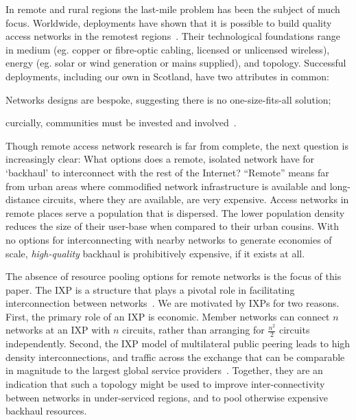 In remote and rural regions the last-mile problem has been the subject of much
focus. Worldwide, deployments have shown that it is possible to build quality
access networks in the remotest regions~\cite{xxx}. Their technological
foundations range in medium (eg. copper or fibre-optic cabling, licensed
or unlicensed wireless), energy (eg. solar or wind generation or
mains supplied), and topology.
Successful deployments, including our own in Scotland,
have two attributes in common:
\begin{inparaenum}[(i)]
  \item Networks designs are bespoke, suggesting
    there is no one-size-fits-all solution;
  \item curcially, communities must be invested and
    involved~\cite{Wallace:2015a,Wallace:2015b}.
\end{inparaenum}

Though remote access network research is far from complete, the next question
is increasingly clear: What options does a remote, isolated network have for
`backhaul' to interconnect with the rest of the Internet? ``Remote'' means far
from urban areas where commodified network infrastructure is available and
long-distance circuits, where they are available, are very expensive. Access
networks in remote places serve a population that is dispersed. The lower
population density reduces the size of their user-base when compared to their
urban cousins. With no options for interconnecting with nearby
networks to generate economies of scale, \emph{high-quality} backhaul
is prohibitively expensive, if it exists at all.


The absence of resource pooling options for remote networks is the focus of this
paper. The \acf{IXP} is a structure that plays a pivotal role in facilitating
interconnection between networks~\cite{Ager:2012}. We are motivated by
\acp{IXP} for two reasons. First, the primary role of an \ac{IXP} is economic.
Member networks can connect $n$ networks at an IXP with $n$ circuits, rather
than arranging for $\frac{n^2}{2}$ circuits independently. Second, the \ac{IXP}
model of multilateral public peering leads to high density interconnections, and
traffic across the exchange that can be comparable in magnitude to the largest
global service providers~\cite{Ager:2012}. Together, they are an indication that
such a topology might be used to improve inter-connectivity between networks in
under-serviced regions, and to pool otherwise expensive backhaul resources.

